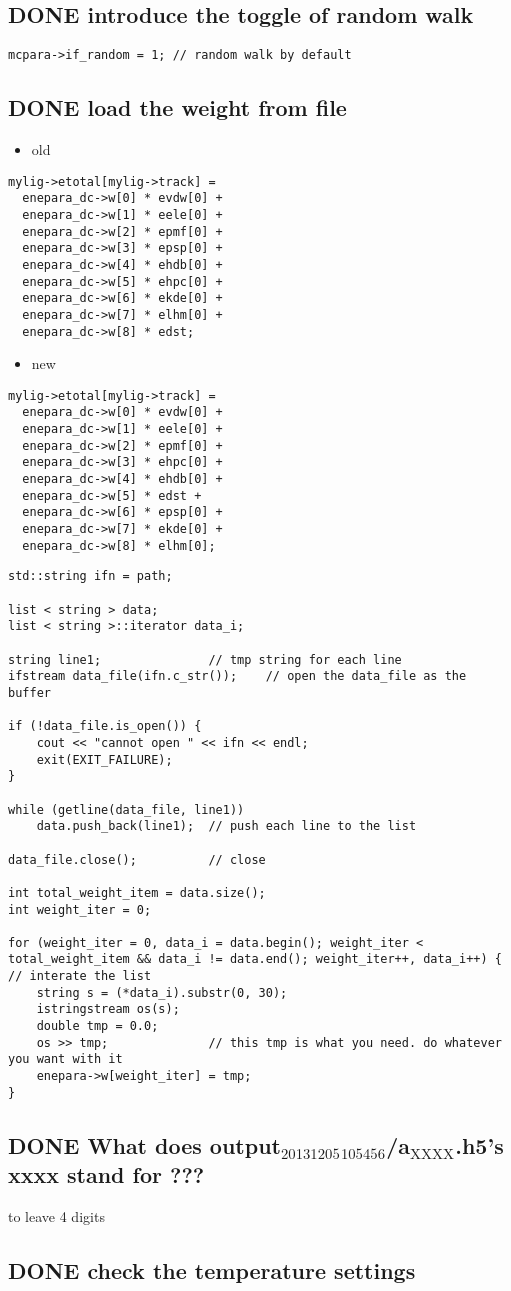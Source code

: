 \documentclass[11pt]{article}
\begin{document}
\subsection{{\bfseries\sffamily DONE} introduce the toggle of random walk}
\label{sec-3-7}
\begin{verbatim}
mcpara->if_random = 1; // random walk by default
\end{verbatim}
\subsection{{\bfseries\sffamily DONE} load the weight from file}
\label{sec-3-8}
\begin{itemize}
\item old
\end{itemize}
\begin{verbatim}
mylig->etotal[mylig->track] =
  enepara_dc->w[0] * evdw[0] +
  enepara_dc->w[1] * eele[0] +
  enepara_dc->w[2] * epmf[0] +
  enepara_dc->w[3] * epsp[0] +
  enepara_dc->w[4] * ehdb[0] +
  enepara_dc->w[5] * ehpc[0] +
  enepara_dc->w[6] * ekde[0] +
  enepara_dc->w[7] * elhm[0] +
  enepara_dc->w[8] * edst;
\end{verbatim}
\begin{itemize}
\item new
\end{itemize}
\begin{verbatim}
mylig->etotal[mylig->track] =
  enepara_dc->w[0] * evdw[0] +
  enepara_dc->w[1] * eele[0] +
  enepara_dc->w[2] * epmf[0] +
  enepara_dc->w[3] * ehpc[0] +
  enepara_dc->w[4] * ehdb[0] +
  enepara_dc->w[5] * edst +
  enepara_dc->w[6] * epsp[0] +
  enepara_dc->w[7] * ekde[0] +
  enepara_dc->w[8] * elhm[0];
\end{verbatim}

\begin{verbatim}
std::string ifn = path;

list < string > data;
list < string >::iterator data_i;

string line1;				// tmp string for each line
ifstream data_file(ifn.c_str());	// open the data_file as the buffer

if (!data_file.is_open()) {
	cout << "cannot open " << ifn << endl;
	exit(EXIT_FAILURE);
}

while (getline(data_file, line1))
	data.push_back(line1);	// push each line to the list

data_file.close();			// close

int total_weight_item = data.size();
int weight_iter = 0;

for (weight_iter = 0, data_i = data.begin(); weight_iter < total_weight_item && data_i != data.end(); weight_iter++, data_i++) {	// interate the list
	string s = (*data_i).substr(0, 30);
	istringstream os(s);
	double tmp = 0.0;
	os >> tmp;				// this tmp is what you need. do whatever you want with it
	enepara->w[weight_iter] = tmp;
}
\end{verbatim}
\subsection{{\bfseries\sffamily DONE} What does output$_{\text{20131205}}$$_{\text{105456}}$/a$_{\text{XXXX}}$.h5's xxxx stand for ???}
\label{sec-3-9}
to leave 4 digits

\subsection{{\bfseries\sffamily DONE} check the temperature settings}
\label{sec-3-10}
\end{document}
